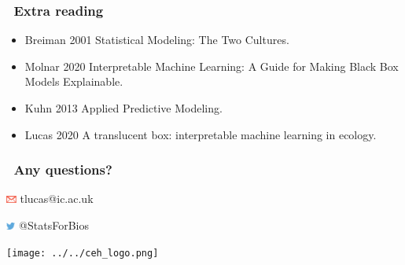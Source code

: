\documentclass[handout, aspectratio = 169]{beamer}
\begin{document}
\begin{frame}
\frametitle{\insertframenumber~Extra reading}

\begin{itemize}
\item Breiman 2001 Statistical Modeling: The Two Cultures.
\item Molnar 2020 Interpretable Machine Learning: A Guide for Making Black Box Models Explainable.
\item Kuhn 2013 Applied Predictive Modeling.
\item Lucas 2020 A translucent box: interpretable machine learning in ecology.
\end{itemize}
\end{frame} 




\begin{frame}

\frametitle{\insertframenumber~Any questions?}

\vspace{5mm}


\vspace{4mm}

\includegraphics[height=7pt]{Ar_Icon_Contact.pdf} tlucas{\footnotesize{@}}ic.ac.uk

\includegraphics[height=7pt]{Twitter_logo_blue-small.png} {\footnotesize{@}}StatsForBios

\vspace{2cm}
\hfill %
\texttt{[image: ../../ceh\_logo.png]}

\end{frame}




 
 
\end{document}
